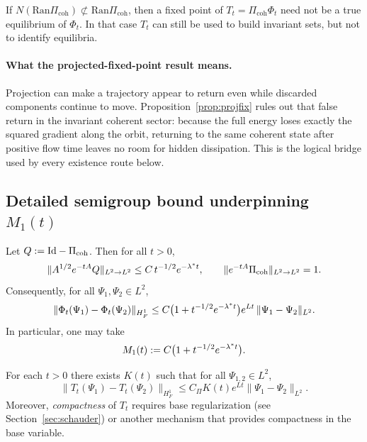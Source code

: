 \documentclass[11pt]{article}
\providecommand{\PiCoh}{\Pi_{\mathrm{coh}}}
\providecommand{\Qop}{Q}
\providecommand{\Ran}{\mathrm{Ran}}
\providecommand{\FPpdf}[2]{\texorpdfstring{#1}{#2}}
\begin{document}
\begin{remark}
If $N(\Ran\PiCoh)\not\subset \Ran\PiCoh$, then a fixed point of $T_t=\PiCoh\Phi_t$ need not be a true equilibrium of $\Phi_t$.
In that case $T_t$ can still be used to build invariant sets, but not to identify equilibria.
\end{remark}

\paragraph{What the projected-fixed-point result means.}
Projection can make a trajectory appear to return even while discarded
components continue to move.  Proposition~\ref{prop:projfix} rules out that
false return in the invariant coherent sector: because the full energy loses
exactly the squared gradient along the orbit, returning to the same coherent
state after positive flow time leaves no room for hidden dissipation.  This
is the logical bridge used by every existence route below.

\subsection{Detailed semigroup bound underpinning \FPpdf{$M_1(t)$}{M1(t)}}

\begin{lemma}\label{lem:semigroup}
Let $\Qop:=\Id-\Pi_{\mathrm{coh}}$. Then for all $t>0$,
\[
\|A^{1/2}e^{-tA}\Qop\|_{L^2\to L^2}
\le C\,t^{-1/2}e^{-\lambda^\* t},
\qquad
\|e^{-tA}\Pi_{\mathrm{coh}}\|_{L^2\to L^2}=1.
\]
Consequently, for all $\Psi_1,\Psi_2\in L^2$,
\[
\|\Phi_t(\Psi_1)-\Phi_t(\Psi_2)\|_{H^1_F}
\le C\bigl(1+t^{-1/2}e^{-\lambda^\* t}\bigr)e^{Lt}\,
\|\Psi_1-\Psi_2\|_{L^2}.
\]
In particular, one may take
\[
M_1(t):=C\bigl(1+t^{-1/2}e^{-\lambda^\* t}\bigr).
\]
\end{lemma}


\begin{lemma}\label{lem:Tlip}
For each $t>0$ there exists $K(t)$ such that for all $\Psi_{1,2}\in L^2$,
\[
\|T_t(\Psi_1)-T_t(\Psi_2)\|_{H^1_F}
\le C_\Pi K(t)e^{Lt}\|\Psi_1-\Psi_2\|_{L^2}.
\]
Moreover, \emph{compactness} of $T_t$ requires base regularization (see Section~\ref{sec:schauder}) or another mechanism that provides compactness in the base variable.
\end{lemma}

\end{document}
